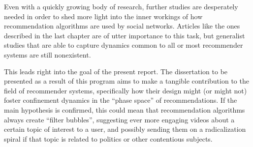 Even with a quickly growing body of research, further studies are desperately
needed in order to shed more light into the inner workings of how recommendation
algorithms are used by social networks. Articles like the ones described in the
last chapter are of utter importance to this task, but generalist studies that
are able to capture dynamics common to all or most recommender systems are still
nonexistent.

This leads right into the goal of the present report. The dissertation to be
presented as a result of this program aims to make a tangible contribution to
the field of recommender systems, specifically how their design might (or might
not) foster confinement dynamics in the ``phase space'' of recommendations. If
the main hypothesis is confirmed, this could mean that recommendation algorithms
always create ``filter bubbles'', suggesting ever more engaging videos about a
certain topic of interest to a user, and possibly sending them on a
radicalization spiral if that topic is related to politics or other contentious
subjects.
